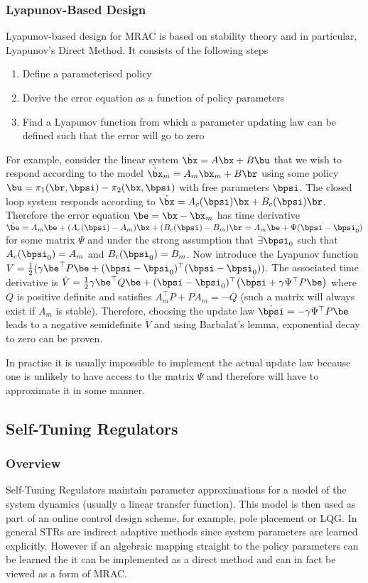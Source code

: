 \subsubsection{Lyapunov-Based Design}
Lyapunov-based design for MRAC is based on stability theory and in particular, Lyapunov's Direct Method.  It consists of the following steps
\begin{enumerate}[	(1)]
\item Define a parameterised policy
\item Derive the error equation as a function of policy parameters
\item Find a Lyapunov function from which a parameter updating law can be defined such that the error will go to zero
\end{enumerate}
For example, consider the linear system $\dot\bx = A\bx + B\bu$ that we wish to respond according to the model $\dot\bx_m = A_m\bx_m + B\br$ using some policy $\bu = \pi_1(\br,\bpsi) - \pi_2(\bx,\bpsi)$ with free parameters $\bpsi$. The closed loop system responds according to $\dot\bx = A_c(\bpsi)\bx + B_c(\bpsi) \br$. Therefore the error equation $\be = \bx - \bx_m$ has time derivative $\dot\be = A_m \be + (A_c(\bpsi) - A_m)\bx + (B_c(\bpsi) - B_m)\br = A_m \be + \Psi(\bpsi - \bpsi_0)$ for some matrix $\Psi$ and under the strong assumption that $\exists \bpsi_0$ such that $A_c(\bpsi_0) = A_m$ and $B_c(\bpsi_0) = B_m$. Now introduce the Lyapunov function $V = \frac{1}{2}(\gamma \be^\top P \be + (\bpsi - \bpsi_0)^\top(\bpsi - \bpsi_0))$. The associated time derivative is $\dot V = \frac{1}{2}\gamma \be^\top Q \be + (\bpsi - \bpsi_0)^\top \big(\dot\bpsi + \gamma\Psi^\top P \be \big)$ where $Q$ is positive definite and satisfies $A_m^\top P + P A_m = -Q$ (such a matrix will always exist if $A_m$ is stable). Therefore, choosing the update law $\dot\bpsi = - \gamma \Psi^\top P \be$ leads to a negative semidefinite $\dot V$ and using Barbalat's lemma, exponential decay to zero can be proven.

In practise it is usually impossible to implement the actual update law because one is unlikely to have access to the matrix $\Psi$ and therefore will have to approximate it in some manner.



\subsection{Self-Tuning Regulators} %

\subsubsection{Overview}
Self-Tuning Regulators maintain parameter approximations for a model of the system dynamics (usually a linear transfer function). This model is then used as part of an online control design scheme, for example, pole placement or LQG. In general STRs are indirect adaptive methods since system parameters are learned explicitly. However if an algebraic mapping straight to the policy parameters can be learned the it can be implemented as a direct method and can in fact be viewed as a form of MRAC.

